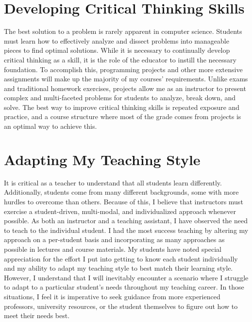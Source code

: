 \section*{Developing Critical Thinking Skills}
\vspace{-0.25cm}
The best solution to a problem is rarely apparent in computer science. Students must learn how to effectively analyze and dissect problems into manageable pieces to find optimal solutions. While it is necessary to continually develop critical thinking as a skill, it is the role of the educator to instill the necessary foundation. To accomplish this, programming projects and other more extensive assignments will make up the majority of my courses’ requirements. Unlike exams and traditional homework exercises, projects allow me as an instructor to present complex and multi-faceted problems for students to analyze, break down, and solve. The best way to improve critical thinking skills is repeated exposure and practice, and a course structure where most of the grade comes from projects is an optimal way to achieve this.

\section*{Adapting My Teaching Style}
\vspace{-0.25cm}
It is critical as a teacher to understand that all students learn differently. Additionally, students come from many different backgrounds, some with more hurdles to overcome than others. Because of this, I believe that instructors must exercise a student-driven, multi-modal, and individualized approach whenever possible. As both an instructor and a teaching assistant, I have observed the need to teach to the individual student. I had the most success teaching by altering my approach on a per-student basis and incorporating as many approaches as possible in lectures and course materials. My students have noted special appreciation for the effort I put into getting to know each student individually and my ability to adapt my teaching style to best match their learning style. However, I understand that I will inevitably encounter a scenario where I struggle to adapt to a particular student's needs throughout my teaching career. In those situations, I feel it is imperative to seek guidance from more experienced professors, university resources, or the student themselves to figure out how to meet their needs best.

